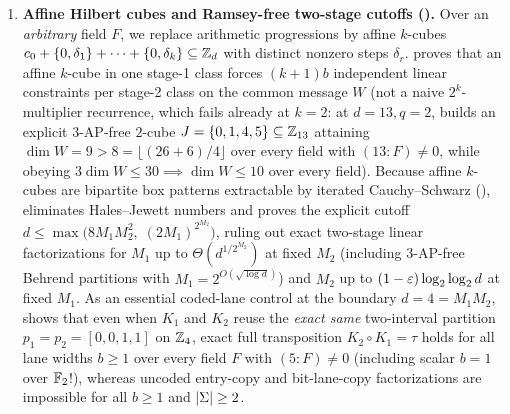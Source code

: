 \begin{enumerate}[label=\arabic*.]
\item \textbf{Affine Hilbert cubes and Ramsey-free two-stage cutoffs ().}
  Over an \emph{arbitrary} field $F$, we replace arithmetic progressions by affine $k$-cubes
  $c_0 + \{0,\delta_1\} + \cdots + \{0,\delta_k\} \subseteq \mathbb{Z}_d$ with distinct nonzero steps
  $\delta_r$.  proves that an affine $k$-cube in one stage-1 class forces
  $(k+1)b$ independent linear constraints per stage-2 class on the common message $W$ (not a naive
  $2^k$-multiplier recurrence, which fails already at $k = 2$: at $d = 13, q = 2$,
   builds an explicit $3$-AP-free $2$-cube $J = \{0,1,4,5\} \subseteq \mathbb{Z}_{13}$
  attaining $\dim W = 9 > 8 = \lfloor(26 + 6)/4\rfloor$ over every field with $(13 : F) \ne 0$,
  while obeying $3\dim W \le 30 \implies \dim W \le 10$ over every field). Because affine $k$-cubes
  are bipartite box patterns extractable by iterated Cauchy--Schwarz (),
   eliminates Hales--Jewett numbers and proves the explicit cutoff
  $d \le \max\bigl(8M_1 M_2^2,\; (2M_1)^{2^{M_2}}\bigr)$, ruling out exact two-stage linear
  factorizations for $M_1$ up to $\Theta(d^{1/2^{M_2}})$ at fixed $M_2$ (including $3$-AP-free
  Behrend partitions with $M_1 = 2^{O(\sqrt{\log d})}$) and $M_2$ up to $(1-\varepsilon)\log_2\log_2 d$ at
  fixed $M_1$. As an essential coded-lane control at the boundary $d = 4 = M_1 M_2$,
   shows that even when $K_1$ and $K_2$ reuse the \emph{exact same} two-interval
  partition $p_1 = p_2 = [0,0,1,1]$ on $\mathbb{Z}_4$, exact full transposition $K_2 \circ K_1 = \tau$ holds
  for all lane widths $b \ge 1$ over every field $F$ with $(5 : F) \ne 0$ (including scalar $b = 1$
  over $\mathbb{F}_2$!), whereas uncoded entry-copy and bit-lane-copy factorizations are impossible for all
  $b \ge 1$ and $\lvert \Sigma \rvert \ge 2$.


\end{enumerate}
